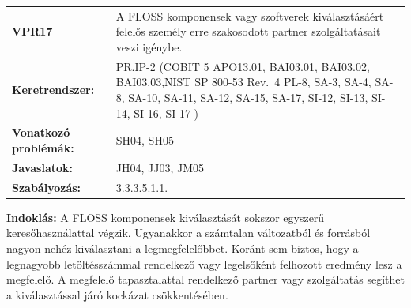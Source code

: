 \documentclass[12pt,magyar,a4paper,oneside]{scrreprt}
\begin{document}
\begin{longtable}[]{@{}ll@{}}
\toprule
\endhead
\begin{minipage}[t]{0.16\columnwidth}\raggedright
\textbf{VPR17}\strut
\end{minipage} & \begin{minipage}[t]{0.79\columnwidth}\raggedright
A FLOSS komponensek vagy szoftverek kiválasztásáért felelős személy erre
szakosodott partner szolgáltatásait veszi igénybe.\strut
\end{minipage}\tabularnewline
\begin{minipage}[t]{0.16\columnwidth}\raggedright
\textbf{Keretrendszer:}\strut
\end{minipage} & \begin{minipage}[t]{0.79\columnwidth}\raggedright
PR.IP-2 (COBIT 5 APO13.01, BAI03.01, BAI03.02, BAI03.03,NIST SP 800-53
Rev.~4 PL-8, SA-3, SA-4, SA-8, SA-10, SA-11, SA-12, SA-15, SA-17, SI-12,
SI-13, SI-14, SI-16, SI-17 )\strut
\end{minipage}\tabularnewline
\begin{minipage}[t]{0.16\columnwidth}\raggedright
\textbf{Vonatkozó problémák:}\strut
\end{minipage} & \begin{minipage}[t]{0.79\columnwidth}\raggedright
SH04, SH05\strut
\end{minipage}\tabularnewline
\begin{minipage}[t]{0.16\columnwidth}\raggedright
\textbf{Javaslatok:}\strut
\end{minipage} & \begin{minipage}[t]{0.79\columnwidth}\raggedright
JH04, JJ03, JM05\strut
\end{minipage}\tabularnewline
\begin{minipage}[t]{0.16\columnwidth}\raggedright
\textbf{Szabályozás:}\strut
\end{minipage} & \begin{minipage}[t]{0.79\columnwidth}\raggedright
3.3.3.5.1.1.\strut
\end{minipage}\tabularnewline
\bottomrule
\end{longtable}

\textbf{Indoklás: } A FLOSS komponensek kiválasztását sokszor egyszerű
keresőhasználattal végzik. Ugyanakkor a számtalan változatból és
forrásból nagyon nehéz kiválasztani a legmegfelelőbbet. Koránt sem
biztos, hogy a legnagyobb letöltésszámmal rendelkező vagy legelsőként
felhozott eredmény lesz a megfelelő. A megfelelő tapasztalattal
rendelkező partner vagy szolgáltatás segíthet a kiválasztással járó
kockázat csökkentésében.
\end{document}

